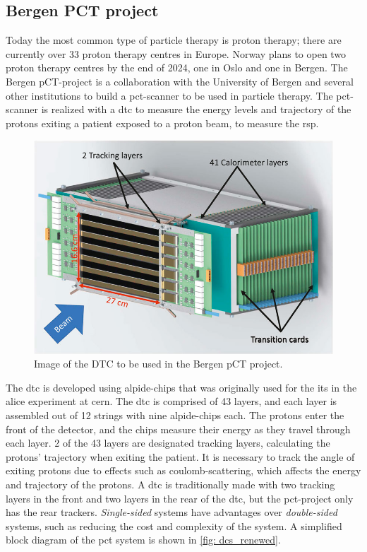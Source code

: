 \documentclass[main.tex]{subfiles}
\begin{document}
\subsection{Bergen PCT project}
Today the most common type of particle therapy is proton therapy; there are currently over 33 proton therapy centres in Europe. Norway plans to open two proton therapy centres by the end of 2024, one in Oslo and one in Bergen. The Bergen pCT-project is a collaboration with the University of Bergen and several other institutions to build a \gls{pct}-scanner to be used in particle therapy. The \gls{pct}-scanner is realized with a \gls{dtc} to measure the energy levels and trajectory of the protons exiting a patient exposed to a proton beam, to measure the \gls{rsp}.

\begin{figure}[!ht]
    \centering
    \includegraphics[scale = 0.5]{images/dtc.jpg}
    \caption{Image of the DTC to be used in the Bergen pCT project.}
    \label{fig: dtc_intro}
\end{figure}
\FloatBarrier

The \gls{dtc} is developed using \gls{alpide}-chips that was originally used for the \gls{its} in the \acrshort{alice} experiment at \acrshort{cern}. The \gls{dtc} is comprised of 43 layers, and each layer is assembled out of 12 strings with nine \gls{alpide}-chips each. The protons enter the front of the detector, and the chips measure their energy as they travel through each layer. 2 of the 43 layers are designated tracking layers, calculating the protons' trajectory when exiting the patient. It is necessary to track the angle of exiting protons due to effects such as coulomb-scattering, which affects the energy and trajectory of the protons. A \gls{dtc} is traditionally made with two tracking layers in the front and two layers in the rear of the \gls{dtc}, but the \gls{pct}-project only has the rear trackers. \textit{Single-sided} systems have advantages over \textit{double-sided} systems, such as reducing the cost and complexity of the system. A simplified block diagram of the \gls{pct} system is shown in \autoref{fig: dcs_renewed}.
\end{document}
